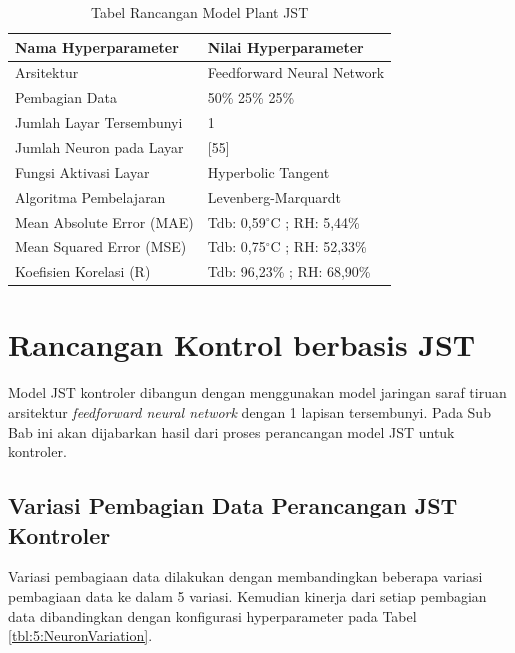 \begin{table}[!h]
	\caption{Tabel Rancangan Model Plant JST\cite{skripsiTanto}}
	\label{tbl:5:NNPlantTanto}
	\centering
	\begin{tabular}{|p{5cm}|p{5.2cm}|}
		\hline
		\textbf{Nama Hyperparameter} & \textbf{Nilai Hyperparameter} \\ \hline
		Arsitektur & Feedforward Neural Network \\ \hline
		Pembagian Data & 50\% 25\% 25\% \\ \hline 
		Jumlah Layar Tersembunyi & 1 \\ \hline
		Jumlah Neuron pada Layar & [55] \\ \hline
		Fungsi Aktivasi Layar & Hyperbolic Tangent \\ \hline
		Algoritma Pembelajaran & Levenberg-Marquardt \\ \hline
		Mean Absolute Error (MAE) & Tdb: 0,59$^\circ$C ; RH: 5,44\% \\ \hline
		Mean Squared Error (MSE) & Tdb: 0,75$^\circ$C ; RH: 52,33\% \\ \hline
		Koefisien Korelasi (R) & Tdb: 96,23\% ; RH: 68,90\% \\ \hline
	\end{tabular}
\end{table}

\section{Rancangan Kontrol berbasis JST}

Model JST kontroler dibangun dengan menggunakan model jaringan saraf tiruan arsitektur \textit{feedforward neural network} dengan 1 lapisan tersembunyi. Pada Sub Bab ini akan dijabarkan hasil dari proses perancangan model JST untuk kontroler.

\subsection{Variasi Pembagian Data Perancangan JST Kontroler}

Variasi pembagiaan data dilakukan dengan membandingkan beberapa variasi pembagiaan data ke dalam 5 variasi. Kemudian kinerja dari setiap pembagian data dibandingkan dengan konfigurasi hyperparameter pada Tabel \ref{tbl:5:NeuronVariation}.\\

